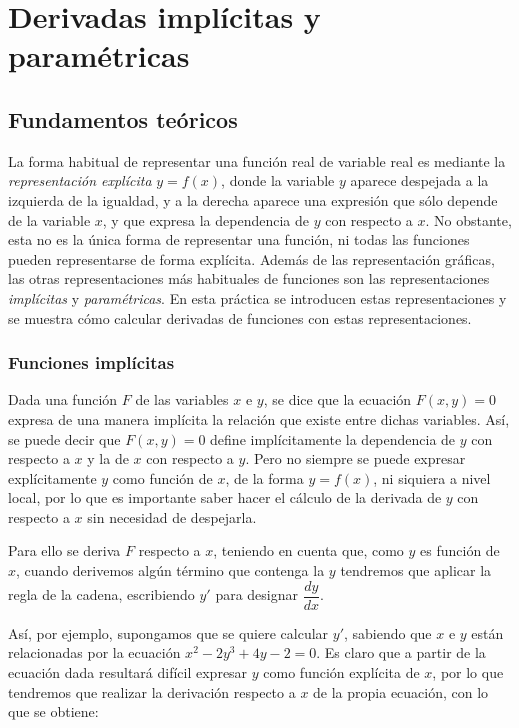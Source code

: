 
\chapter{Derivadas implícitas y paramétricas}

\section{Fundamentos teóricos}
La forma habitual de representar una función real de variable real
es mediante la \emph{representación explícita} $y=f(x)$, donde la
variable $y$ aparece despejada a la izquierda de la igualdad, y a la
derecha aparece una expresión que sólo depende de la variable $x$, y
que expresa la dependencia de $y$ con respecto a $x$. No obstante,
esta no es la única forma de representar una función, ni todas las
funciones pueden representarse de forma explícita. Además de las
representación gráficas, las otras representaciones más habituales
de funciones son las representaciones \emph{implícitas} y
\emph{paramétricas}. En esta práctica se introducen estas
representaciones y se muestra cómo calcular derivadas de funciones
con estas representaciones.

\subsection*{Funciones implícitas}

Dada una función $F$ de las variables $x$ e $y$, se dice que la ecuación $F(x,y)=0$ expresa de una manera implícita la relación que existe entre dichas variables. Así, se puede decir que $F(x,y)=0$ define implícitamente la dependencia de $y$ con respecto a $x$ y la de $x$ con respecto a $y$. Pero no siempre se puede expresar explícitamente $y$ como función de $x$, de la forma $y=f(x)$, ni siquiera a nivel local, por lo que es importante saber hacer el cálculo de la derivada de $y$ con respecto a $x$ sin necesidad de despejarla.

Para ello se deriva $F$ respecto a $x$, teniendo en cuenta que, como $y$ es función de $x$, cuando derivemos algún término que contenga la $y$ tendremos que aplicar la regla de la cadena, escribiendo $y'$ para designar $\dfrac{dy}{dx}$.

Así, por ejemplo, supongamos que se quiere calcular $y'$, sabiendo que $x$ e $y$ están relacionadas por la ecuación $x^2-2y^3+4y-2=0$. Es claro que a partir de la ecuación dada resultará difícil expresar $y$ como función explícita de $x$, por lo que tendremos que realizar la derivación respecto a $x$ de la propia ecuación, con lo que se obtiene:

